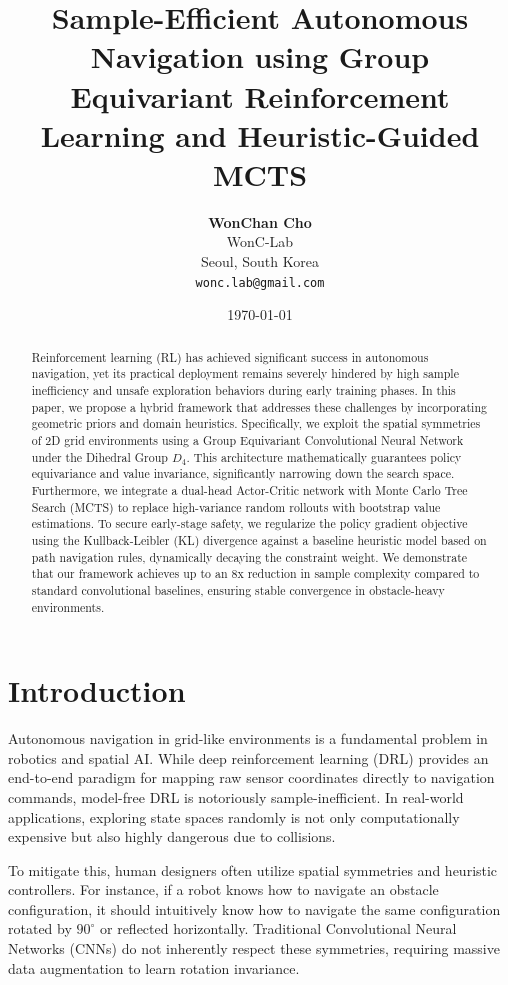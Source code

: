 \documentclass{article}
\title{\textbf{Sample-Efficient Autonomous Navigation using Group Equivariant Reinforcement Learning and Heuristic-Guided MCTS}}
\author{
  \textbf{WonChan Cho} \\
  WonC-Lab \\
  Seoul, South Korea \\
  \texttt{wonc.lab@gmail.com}
}
\date{\today}
\begin{document}
\maketitle

\begin{abstract}
Reinforcement learning (RL) has achieved significant success in autonomous navigation, yet its practical deployment remains severely hindered by high sample inefficiency and unsafe exploration behaviors during early training phases. In this paper, we propose a hybrid framework that addresses these challenges by incorporating geometric priors and domain heuristics. Specifically, we exploit the spatial symmetries of 2D grid environments using a Group Equivariant Convolutional Neural Network under the Dihedral Group $D_4$. This architecture mathematically guarantees policy equivariance and value invariance, significantly narrowing down the search space. Furthermore, we integrate a dual-head Actor-Critic network with Monte Carlo Tree Search (MCTS) to replace high-variance random rollouts with bootstrap value estimations. To secure early-stage safety, we regularize the policy gradient objective using the Kullback-Leibler (KL) divergence against a baseline heuristic model based on path navigation rules, dynamically decaying the constraint weight. We demonstrate that our framework achieves up to an 8x reduction in sample complexity compared to standard convolutional baselines, ensuring stable convergence in obstacle-heavy environments.
\end{abstract}

\section{Introduction}
Autonomous navigation in grid-like environments is a fundamental problem in robotics and spatial AI. While deep reinforcement learning (DRL) provides an end-to-end paradigm for mapping raw sensor coordinates directly to navigation commands, model-free DRL is notoriously sample-inefficient. In real-world applications, exploring state spaces randomly is not only computationally expensive but also highly dangerous due to collisions.

To mitigate this, human designers often utilize spatial symmetries and heuristic controllers. For instance, if a robot knows how to navigate an obstacle configuration, it should intuitively know how to navigate the same configuration rotated by $90^\circ$ or reflected horizontally. Traditional Convolutional Neural Networks (CNNs) do not inherently respect these symmetries, requiring massive data augmentation to learn rotation invariance. 
\end{document}
